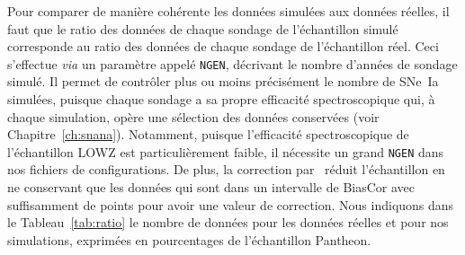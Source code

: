 \documentclass[../main/main.tex]{subfiles}
\begin{document}
Pour comparer de manière cohérente les données simulées aux données réelles, il
faut que le ratio des données de chaque sondage de l'échantillon simulé
corresponde au ratio des données de chaque sondage de l'échantillon réel. Ceci
s'effectue \textit{via} un paramètre appelé \texttt{NGEN}, décrivant le nombre
d'années de sondage simulé. Il permet de contrôler plus ou moins précisément le
nombre de SNe~Ia simulées, puisque chaque sondage a sa propre efficacité
spectroscopique qui, à chaque simulation, opère une sélection des données
conservées (voir Chapitre~\ref{ch:snana}). Notamment, puisque l'efficacité
spectroscopique de l'échantillon LOWZ est particulièrement faible, il nécessite
un grand \texttt{NGEN} dans nos fichiers de configurations. De plus, la
correction par \bbc\ réduit l'échantillon en ne conservant que les données qui
sont dans un intervalle de BiasCor avec suffisamment de points pour avoir une
valeur de correction. Nous indiquons dans le Tableau~\ref{tab:ratio} le
nombre de données pour les données réelles et pour nos simulations, exprimées en
pourcentages de l'échantillon Pantheon.
\end{document}
